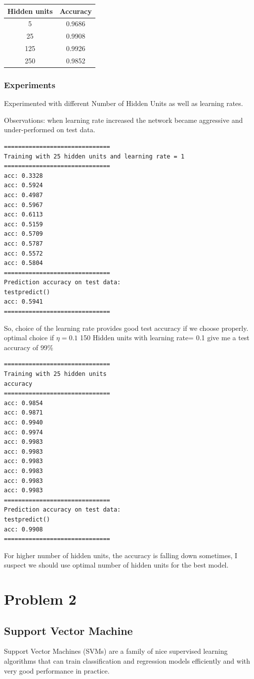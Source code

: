 \documentclass[10pt,a4paper]{article}
\begin{document}
\begin{tabular}{|c|c|}
\hline 
Hidden units & Accuracy \\ 
\hline 
5 & 0.9686 \\ 
\hline 
25 & 0.9908 \\ 
\hline 
125 & 0.9926 \\ 
\hline 
250 & 0.9852 \\ 
\hline 
\end{tabular} 
\clearpage
\subsubsection*{Experiments}
Experimented with different Number of Hidden Units as well as learning rates. 

Observations: 
when learning rate increased the network became aggressive and under-performed on test data. 
\begin{verbatim}
==============================
Training with 25 hidden units and learning rate = 1
==============================
acc: 0.3328
acc: 0.5924
acc: 0.4987
acc: 0.5967
acc: 0.6113
acc: 0.5159
acc: 0.5709
acc: 0.5787
acc: 0.5572
acc: 0.5804
==============================
Prediction accuracy on test data: 
testpredict()
acc: 0.5941
==============================
\end{verbatim}

So, choice of the learning rate provides good test accuracy if we choose properly. optimal choice if $\eta = 0.1$
150 Hidden units with learning rate= 0.1 give me a test accuracy of 99\%
\begin{verbatim}
==============================
Training with 25 hidden units
accuracy
==============================
acc: 0.9854
acc: 0.9871
acc: 0.9940
acc: 0.9974
acc: 0.9983
acc: 0.9983
acc: 0.9983
acc: 0.9983
acc: 0.9983
acc: 0.9983
==============================
Prediction accuracy on test data: 
testpredict()
acc: 0.9908
==============================

\end{verbatim}
For higher number of hidden units, the accuracy is falling down sometimes, I suspect we should use optimal number of hidden units for the best model. 
\clearpage

\section{Problem 2}
\subsection{Support Vector Machine}
Support Vector Machines (SVMs) are a family of nice supervised learning algorithms that can train classification and regression models efficiently and with very good performance in practice.\\
\end{document}
